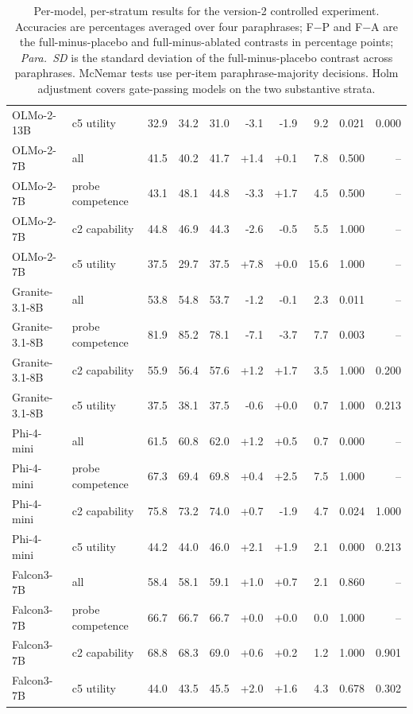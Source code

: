 \begin{table}[t]
\begin{tabular}{@{}llrrrrrrrr@{}}
OLMo-2-13B & c5 utility & 32.9 & 34.2 & 31.0 & -3.1 & -1.9 & 9.2 & 0.021 & 0.000 \\
OLMo-2-7B & all & 41.5 & 40.2 & 41.7 & +1.4 & +0.1 & 7.8 & 0.500 & -- \\
OLMo-2-7B & probe competence & 43.1 & 48.1 & 44.8 & -3.3 & +1.7 & 4.5 & 0.500 & -- \\
OLMo-2-7B & c2 capability & 44.8 & 46.9 & 44.3 & -2.6 & -0.5 & 5.5 & 1.000 & -- \\
OLMo-2-7B & c5 utility & 37.5 & 29.7 & 37.5 & +7.8 & +0.0 & 15.6 & 1.000 & -- \\
Granite-3.1-8B & all & 53.8 & 54.8 & 53.7 & -1.2 & -0.1 & 2.3 & 0.011 & -- \\
Granite-3.1-8B & probe competence & 81.9 & 85.2 & 78.1 & -7.1 & -3.7 & 7.7 & 0.003 & -- \\
Granite-3.1-8B & c2 capability & 55.9 & 56.4 & 57.6 & +1.2 & +1.7 & 3.5 & 1.000 & 0.200 \\
Granite-3.1-8B & c5 utility & 37.5 & 38.1 & 37.5 & -0.6 & +0.0 & 0.7 & 1.000 & 0.213 \\
Phi-4-mini & all & 61.5 & 60.8 & 62.0 & +1.2 & +0.5 & 0.7 & 0.000 & -- \\
Phi-4-mini & probe competence & 67.3 & 69.4 & 69.8 & +0.4 & +2.5 & 7.5 & 1.000 & -- \\
Phi-4-mini & c2 capability & 75.8 & 73.2 & 74.0 & +0.7 & -1.9 & 4.7 & 0.024 & 1.000 \\
Phi-4-mini & c5 utility & 44.2 & 44.0 & 46.0 & +2.1 & +1.9 & 2.1 & 0.000 & 0.213 \\
Falcon3-7B & all & 58.4 & 58.1 & 59.1 & +1.0 & +0.7 & 2.1 & 0.860 & -- \\
Falcon3-7B & probe competence & 66.7 & 66.7 & 66.7 & +0.0 & +0.0 & 0.0 & 1.000 & -- \\
Falcon3-7B & c2 capability & 68.8 & 68.3 & 69.0 & +0.6 & +0.2 & 1.2 & 1.000 & 0.901 \\
Falcon3-7B & c5 utility & 44.0 & 43.5 & 45.5 & +2.0 & +1.6 & 4.3 & 0.678 & 0.302 \\
\bottomrule
\end{tabular}
\caption{Per-model, per-stratum results for the version-2 controlled experiment. Accuracies are percentages averaged over four paraphrases; F$-$P and F$-$A are the full-minus-placebo and full-minus-ablated contrasts in percentage points; \emph{Para.\ SD} is the standard deviation of the full-minus-placebo contrast across paraphrases. McNemar tests use per-item paraphrase-majority decisions. Holm adjustment covers gate-passing models on the two substantive strata.}
\label{tab:controlled-model-judges-strata-v2}
\end{table}
